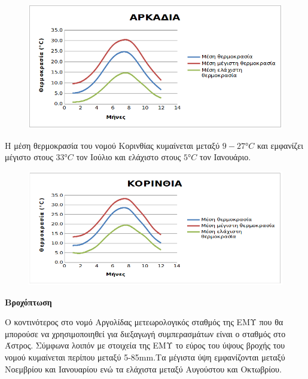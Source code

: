 \documentclass[12pt]{article}
\newcommand{\gr}{\selectlanguage{greek}}
\newcommand{\eng}{\selectlanguage{english}}
\begin{document}
	\begin{figure} [H]
		\begin{center}
			\includegraphics [scale = 0.80] {diagram2.png}
		\end{center}
	\end{figure}

	Η μέση θερμοκρασία του νομού Κορινθίας κυμαίνεται μεταξύ $9-27°C$ και εμφανίζει μέγιστο στους $33°C$ τον Ιούλιο και ελάχιστο στους $5°C$ τον Ιανουάριο.
	
	\begin{figure} [H]
		\begin{center}
			\includegraphics [scale = 0.80] {diagram3.png}
		\end{center}
	\end{figure}

	\textbf{Βροχόπτωση}
	
	Ο κοντινότερος στο νομό Αργολίδας μετεωρολογικός σταθμός της ΕΜΥ που θα μπορούσε να χρησιμοποιηθεί για διεξαγωγή συμπερασμάτων είναι ο σταθμός στο Άστρος. Σύμφωνα λοιπόν με στοιχεία της ΕΜΥ το εύρος του ύψους βροχής του νομού κυμαίνεται περίπου μεταξύ 5-85\eng mm.\gr Τα μέγιστα ύψη εμφανίζονται μεταξύ Νοεμβρίου και Ιανουαρίου ενώ τα ελάχιστα μεταξύ Αυγούστου και Οκτωβρίου. 
	
\end{document}
